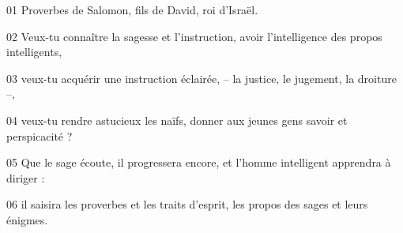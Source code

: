01 Proverbes de Salomon, fils de David, roi d’Israël.

02 Veux-tu connaître la sagesse et l’instruction, avoir l’intelligence des propos intelligents,

03 veux-tu acquérir une instruction éclairée, – la justice, le jugement, la droiture –,

04 veux-tu rendre astucieux les naïfs, donner aux jeunes gens savoir et perspicacité ?

05 Que le sage écoute, il progressera encore, et l’homme intelligent apprendra à diriger :

06 il saisira les proverbes et les traits d’esprit, les propos des sages et leurs énigmes.
